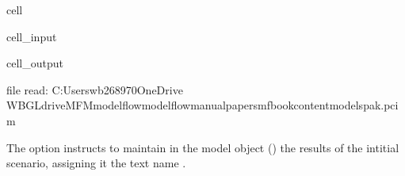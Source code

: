 \documentclass[letterpaper,10pt,english]{jupyterBook}
\begin{document}
\begin{sphinxuseclass}{cell}\begin{sphinxVerbatimInput}

\begin{sphinxuseclass}{cell_input}
\begin{sphinxVerbatim}[commandchars=\\\{\}]
   \PYGZbs{}
                                 
\end{sphinxVerbatim}

\end{sphinxuseclass}\end{sphinxVerbatimInput}
\begin{sphinxVerbatimOutput}

\begin{sphinxuseclass}{cell_output}
\begin{sphinxVerbatim}[commandchars=\\\{\}]
file read:  C:\PYGZbs{}Users\PYGZbs{}wb268970\PYGZbs{}OneDrive \PYGZhy{} WBG\PYGZbs{}Ldrive\PYGZbs{}MFM\PYGZbs{}modelflow\PYGZbs{}modelflow\PYGZhy{}manual\PYGZbs{}papers\PYGZbs{}mfbook\PYGZbs{}content\PYGZbs{}models\PYGZbs{}pak.pcim
\end{sphinxVerbatim}

\end{sphinxuseclass}\end{sphinxVerbatimOutput}

\end{sphinxuseclass}
\sphinxAtStartPar
The  option instructs  to maintain in the model object () the results of the intitial scenario, assigning it the text name .
\end{document}
